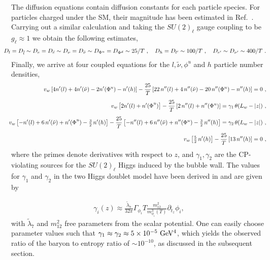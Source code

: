 \documentclass[prd,showpcs,amsmath,amssymb,nofootinbib,preprintnumbers,balancelastpage,longbibliography,superscriptaddress,notitlepage]{revtex4}
\def\bea{\begin{eqnarray}}
\def\eea{\end{eqnarray}}
\def\bea{\begin{eqnarray}}
\def\eea{\end{eqnarray}}
\begin{document}
The diffusion equations contain diffusion constants for each particle species. For particles charged under the SM,
their magnitude has been estimated in Ref.~\cite{Joyce:1994zn}. Carrying out a similar calculation and taking the $SU(2)_\ell$ gauge coupling to be $g_\ell \approx 1$ we obtain the following estimates,
\bea
\hspace{-5mm}D_l = D_{\tilde{l}} \sim D_e = D_{\tilde{e}} \sim D_\nu = D_{\tilde{\nu}} \sim D_{\Phi^u} = D_{\Phi^d} \sim 25 / T\ , \ \ \ D_h = D_{l'} \sim 100 / T \ , \ \ \ D_{e'} \sim D_{\nu'} \sim 400 / T  \ .
\eea
Finally, we arrive at four coupled equations for the $l, \tilde{\nu}, \phi^u$ and $h$ particle number densities,
\bea
\label{dee1}
&& \hspace{-5mm}v_w\left[4n'(l)+4{n'(\tilde{\nu}})-2{n'({\Phi}^u})-n'(h)\right] - \frac{25}{T}\left[22\,n''(l) + 4\,n''(\tilde{\nu}) - 20 \,{n''(\Phi^u}) - n''(h)\right] = 0 \ , \\[5pt]
\label{dee2}
&& \hspace{-5mm}v_w\left[2n'(l)+{{n'(\Phi}^u})\right] - \frac{25}{T}\left[2\,n''(l) + {n''(\Phi^u}) \right] = \gamma_1 \, \theta(L_w-|z|) \ ,\\[5pt]
\label{dee3}
&& \hspace{-5mm}v_w\left[-n'(l)+6\,{n'(\tilde{\nu}})+{{n'(\Phi}^u})-\tfrac{3}{2}\,{n'(h})\right] - \frac{25}{T}\left[-n''(l) + 6\,n''(\tilde{\nu}) +{n''(\Phi^u}) -\tfrac{3}{2}\,n''(h)\right] = \gamma_2 \, \theta(L_w-|z|) \ ,\\[5pt]
&&  \hspace{-5mm}v_w\left[\tfrac{5}{2}\,{n'(h})\right] - \frac{25}{T}\left[13\,n''(h)\right] = 0 \ ,
\label{dee}
\eea
where the primes denote derivatives with respect to $z$, and $\gamma_1, \gamma_2$ are the CP-violating sources for the $SU(2)_\ell$ Higgs induced by the bubble wall.
The values for $\gamma_1$ and $\gamma_2$ in the two Higgs doublet model have been derived in \cite{Riotto:1995hh} and are given by 

\bea
\gamma_i(z) \approx \frac{\tilde{\lambda}_7}{32\pi}\Gamma_{\phi_i}T \frac{m^2_{12}}{m^3_{\phi_i}(T)}\partial_{t_z} \phi_i,
\eea
with $\tilde{\lambda}_7$ and $m^2_{12}$ free parameters from the scalar potential.
One can easily choose parameter values such that $\gamma_1 \approx \gamma_2 \approx 5 \times 10^{-5} \ {\rm GeV^4}$, 
which yields the observed ratio of the baryon to entropy ratio of $\sim 10^{-10}$, as discussed in the subsequent section.
\end{document}
